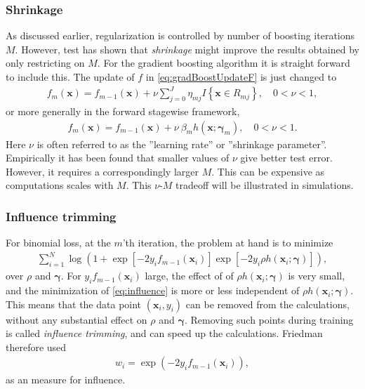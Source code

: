 \subsubsection{Shrinkage}
\label{sub:Shrinkage}
As discussed earlier, regularization is controlled by number of boosting iterations $M$. However, test has shown  \cite{copas1983} that \textit{shrinkage} might improve the results obtained by only restricting on $M$. For the gradient boosting algorithm it is straight forward to include this. 
The update of $f$ in \eqref{eq:gradBoostUpdateF} is just changed to
\begin{align}
  f_m(\mathbf{x}) = f_{m-1}(\mathbf{x}) +  \nu \sum^{J}_{j=0} \eta_{m j} I\left\{ \mathbf{x} \in R_{m j} \right\}, \quad 0 < \nu < 1,
\end{align}
or more generally in the forward stagewise framework,
\begin{align}
  f_m(\mathbf{x}) = f_{m-1}(\mathbf{x}) +  \nu \: \beta_m h(\mathbf{x}; \bm \gamma_m), \quad 0 < \nu < 1.
\end{align}
Here $\nu$ is often referred to as the ''learning rate'' or ''shrinkage parameter''. Empirically it has been found \cite{friedman} that smaller values of $\nu$ give better test error. However, it requires a correspondingly larger $M$. This can be expensive as computations scales with $M$. This $\nu$-$M$ tradeoff will be illustrated in simulations.


\subsubsection{Influence trimming}
\label{sub:Influence trimming}
For binomial loss, at the $m$'th iteration, the problem at hand is to minimize
\begin{align}
  \label{eq:influence} 
  \sum_{i = 1}^{N} \log \left( 1 + \exp[ -2 y_i f_{m-1}(\mathbf{x}_i)] \exp [-2 y_i \rho h(\mathbf{x}_i; \bm \gamma)] \right),
\end{align}
over $\rho$ and $\bm \gamma$.  For $y_i f_{m-1}(\mathbf{x}_i)$ large, the effect of of $\rho h(\mathbf{x}_i; \bm{\gamma})$ is very small, and the minimization of \eqref{eq:influence} is more or less independent of $\rho h(\mathbf{x}_i; \bm \gamma)$. This means that the data point $(\mathbf{x}_i, y_i)$ can be removed from the calculations, without any substantial effect on $\rho$ and $\bm \gamma$. Removing such points during training is called \textit{influence trimming}, and can speed up the calculations. Friedman therefore used 
\begin{align}
  w_i = \exp (- 2 y_i f_{m-1}(\mathbf{x}_i)), 
\end{align}
as an measure for influence. 

